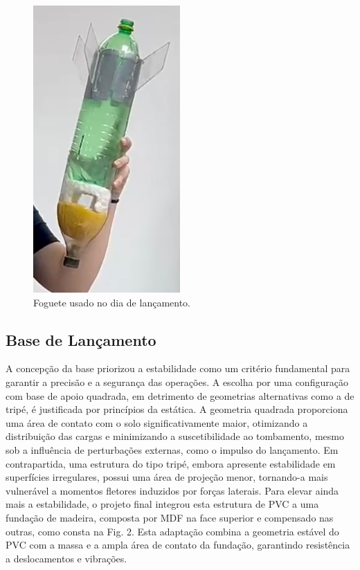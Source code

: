 \begin{figure}[H]
	\centering
	\includegraphics[width=0.5\textwidth,height=\textheight,keepaspectratio]{figuras/estruturas/foguete_foto.png}
	\caption{Foguete usado no dia de lançamento.}
	\label{fig_foguete_lancamento}
\end{figure}

\subsection{Base de Lançamento}

A concepção da base priorizou a estabilidade como um critério fundamental para garantir a precisão e a segurança das operações. A escolha por uma configuração com base de apoio quadrada, em detrimento de geometrias alternativas como a de tripé, é justificada por princípios da estática. A geometria quadrada proporciona uma área de contato com o solo significativamente maior, otimizando a distribuição das cargas e minimizando a suscetibilidade ao tombamento, mesmo sob a influência de perturbações externas, como o impulso do lançamento. Em contrapartida, uma estrutura do tipo tripé, embora apresente estabilidade em superfícies irregulares, possui uma área de projeção menor, tornando-a mais vulnerável a momentos fletores induzidos por forças laterais. Para elevar ainda mais a estabilidade, o projeto final integrou esta estrutura de PVC a uma fundação de madeira, composta por MDF na face superior e compensado nas outras, como consta na Fig. 2. Esta adaptação combina a geometria estável do PVC com a massa e a ampla área de contato da fundação, garantindo resistência a deslocamentos e vibrações.

